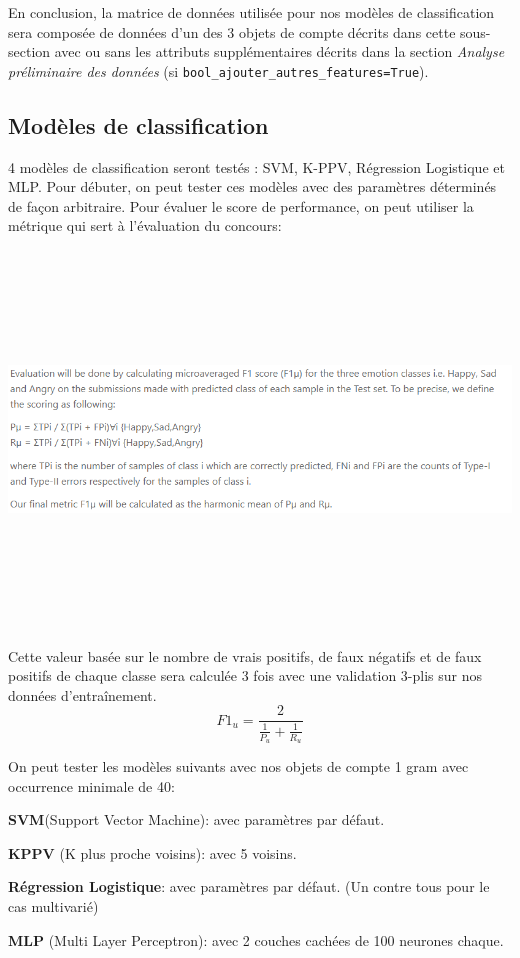 \documentclass[12pt,french]{article}
\begin{document}
En conclusion, la matrice de données utilisée pour nos modèles de classification sera composée de données d'un des 3 objets de compte décrits dans cette sous-section avec ou sans les attributs supplémentaires décrits dans la section \emph{Analyse préliminaire des données} (si \verb|bool_ajouter_autres_features=True|).

\subsection*{Modèles de classification}
4 modèles de classification seront testés : SVM, K-PPV, Régression Logistique et MLP. Pour débuter, on peut tester ces modèles avec des paramètres déterminés de façon arbitraire. Pour évaluer le score de performance, on peut utiliser la métrique qui sert à l'évaluation du concours:

\includegraphics[width=\linewidth,height=10cm,keepaspectratio]{metric_concour}

Cette valeur basée sur le nombre de vrais positifs, de faux négatifs et de faux positifs de chaque classe sera calculée 3 fois avec une validation 3-plis sur nos données d'entraînement.
\begin{equation}
F1_{u} =\frac{2}{\frac{1}{P_{u}}+\frac{1}{R_{u}}}
\end{equation}

On peut tester les modèles suivants avec nos objets de compte 1 gram avec occurrence minimale de 40:
\begin{description}
\item \textbf{SVM}(Support Vector Machine): avec paramètres par défaut.
\item \textbf{KPPV} (K plus proche voisins): avec 5 voisins.
\item \textbf{Régression Logistique}: avec paramètres par défaut. (Un contre tous pour le cas multivarié)
\item \textbf{MLP} (Multi Layer Perceptron): avec 2 couches cachées de 100 neurones chaque.
\end{description}
\end{document}

